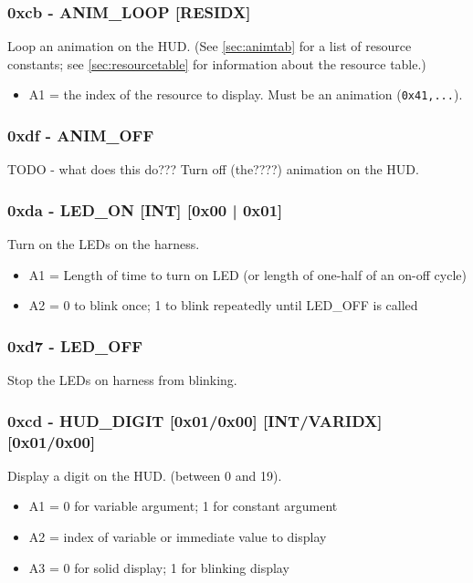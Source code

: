\documentclass[12pt,a4paper]{scrbook}
\begin{document}
\subsubsection{0xcb - ANIM\_LOOP [RESIDX]}
Loop an animation on the HUD.  (See \ref{sec:animtab} for a list of resource constants;
see \ref{sec:resourcetable} for information about the resource table.)
\begin{itemize}
\item A1 = the index of the resource to display.  Must be an animation (\texttt{0x41,...}).
\end{itemize}


\subsubsection{0xdf - ANIM\_OFF}
TODO - what does this do???
Turn off (the????) animation on the HUD.

\subsubsection{0xda - LED\_ON [INT] [0x00 | 0x01]}
Turn on the LEDs on the harness.
\begin{itemize}
\item A1 = Length of time to turn on LED (or length of one-half of an on-off cycle)
\item A2 = 0 to blink once; 1 to blink repeatedly until LED\_OFF is called
\end{itemize}

\subsubsection{0xd7 - LED\_OFF}
Stop the LEDs on harness from blinking.



\subsubsection{0xcd - HUD\_DIGIT [0x01/0x00] [INT/VARIDX] [0x01/0x00]}
Display a digit on the HUD. (between 0 and 19).  
\begin{itemize}
\item A1 = 0 for variable argument; 1 for constant argument
\item A2 = index of variable or immediate value to display
\item A3 = 0 for solid display; 1 for blinking display
\end{itemize}
\end{document}

